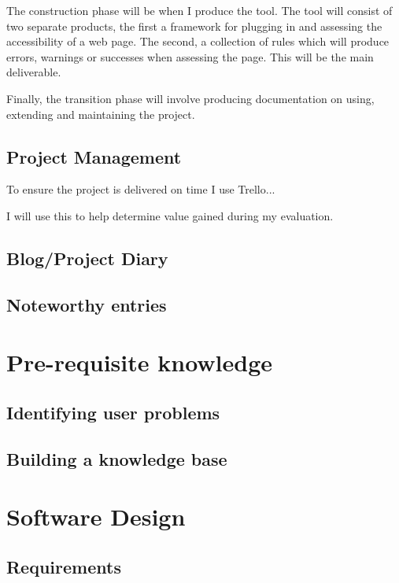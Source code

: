 The construction phase will be when I produce the tool. The tool will consist of two separate products, the first a framework for plugging
in and assessing the accessibility of a web page. The second, a collection of rules which will produce errors, warnings or successes when
assessing the page. This will be the main deliverable.

Finally, the transition phase will involve producing documentation on using, extending and maintaining the project.

\subsection{Project Management}
To ensure the project is delivered on time I use Trello...

I will use this to help determine value gained during my evaluation.

\subsection{Blog/Project Diary}

\subsection{Noteworthy entries}

\section{Pre-requisite knowledge}
\subsection{Identifying user problems}

\subsection{Building a knowledge base}

\section{Software Design}
\subsection{Requirements}
